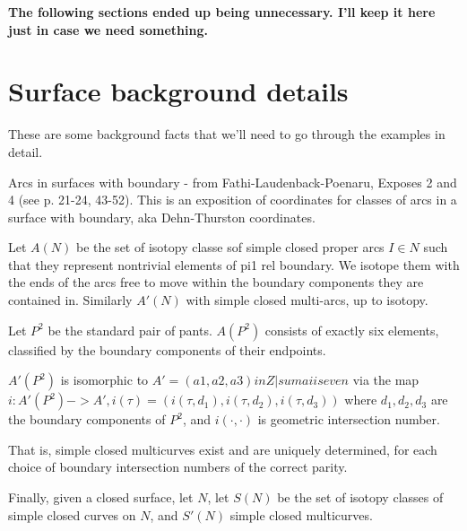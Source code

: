 \textbf{ The following sections ended up being unnecessary. I'll keep it here just
in case we need something. }

{\tiny

\section{Surface background details}

These are some background facts that we'll need to go through the examples in
detail.

Arcs in surfaces with boundary - from Fathi-Laudenback-Poenaru, Exposes 2 and
4 (see p. 21-24, 43-52).
This is an exposition of coordinates for classes of arcs in a surface
with boundary, aka Dehn-Thurston coordinates.

Let $A(N)$ be the set of isotopy classe sof simple closed proper arcs $I\in N$
such that they represent nontrivial elements of pi1 rel boundary. We isotope
them with the ends of the arcs free to move within the boundary components they
are contained in. Similarly $A'(N)$ with simple closed multi-arcs, up to
isotopy.

\begin{thm}[FLP 2.11]

Let $P^2$ be the standard pair of pants. $A(P^2)$ consists of exactly six
elements, classified by the boundary components of their endpoints.

\end{thm}

\begin{thm}[FLP 2.12]

$A'(P^2)$ is isomorphic to $A'={(a1,a2,a3) in Z | sum ai is even }$ via the map
$i:A'(P^2)->A', i(\tau) = (i(\tau, d_1),i(\tau,d_2),i(\tau,d_3))$ where
$d_1,d_2,d_3$ are the boundary components of $P^2$, and $i(\cdot,\cdot)$ is
geometric intersection number.

\end{thm}

That is, simple closed multicurves exist and are uniquely determined, for each
choice of boundary intersection numbers of the correct parity.

Finally, given a closed surface, let $N$, let $S(N)$ be the set of isotopy
classes of simple closed curves on $N$, and $S'(N)$ simple closed multicurves.

\begin{thm}[FLP 4.8]


\end{thm}}
